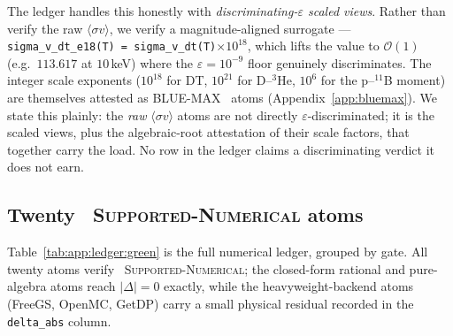 The ledger handles this honestly with \emph{discriminating-$\varepsilon$
scaled views}. Rather than verify the raw $\langle\sigma v\rangle$, we
verify a magnitude-aligned surrogate --- \texttt{sigma\_v\_dt\_e18(T) =
sigma\_v\_dt(T)$\times10^{18}$}, which lifts the value to
$\mathcal{O}(1)$ (e.g.\ $113.617$ at $10$\,keV) where the
$\varepsilon=10^{-9}$ floor genuinely discriminates. The integer scale
exponents ($10^{18}$ for DT, $10^{21}$ for D--$^3$He, $10^{6}$ for the
p--$^{11}$B moment) are themselves attested as BLUE-MAX
\tierBlue\ atoms (Appendix~\ref{app:bluemax}). We state this plainly:
the \emph{raw} $\langle\sigma v\rangle$ atoms are not directly
$\varepsilon$-discriminated; it is the scaled views, plus the
algebraic-root attestation of their scale factors, that together carry
the load. No row in the ledger claims a discriminating verdict it does
not earn.

\subsection{Twenty \tierGreen\ \textsc{Supported-Numerical} atoms}
\label{app:verify-ledger:green}

Table~\ref{tab:app:ledger:green} is the full numerical ledger, grouped
by gate. All twenty atoms verify \tierGreen\ \textsc{Supported-Numerical};
the closed-form rational and pure-algebra atoms reach $|\Delta|=0$
exactly, while the heavyweight-backend atoms (FreeGS, OpenMC, GetDP)
carry a small physical residual recorded in the \texttt{delta\_abs}
column.

